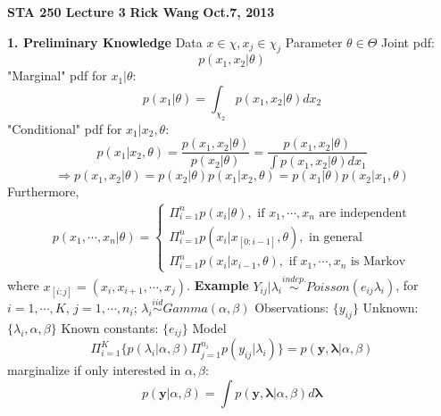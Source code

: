 \documentclass[12pt]{article}
\begin{document}
\begin{center}
	\Large\textbf{STA 250 Lecture 3} \newline
	\small\textbf{Rick Wang} \newline
	\small\textbf{Oct.7, 2013} \newline
\end{center}
\textbf{1. Preliminary Knowledge} \newline \newline
Data $x \in \chi, x_j \in \chi_j$ \newline Parameter $\theta \in \Theta$ \newline
Joint pdf:
\[
	p(x_1, x_2 | \theta)
\]
"Marginal" pdf for $x_1 | \theta$:
\[
	p(x_1 | \theta) = \int_{\chi_2} p(x_1, x_2 | \theta) dx_2
\]
"Conditional" pdf for $x_1 | x_2, \theta$:
\[
	p(x_1 | x_2, \theta) = \frac{p(x_1, x_2 | \theta)}{p(x_2 | \theta)} = \frac{p(x_1, x_2 | \theta)}{\int p(x_1, x_2 | \theta) dx_1}
\]
\[
	\Rightarrow p(x_1, x_2 | \theta) = p(x_2 | \theta) p(x_1 | x_2, \theta) = p(x_1 | \theta) p(x_2 | x_1, \theta)
\]
Furthermore,
\begin{align*}
	p(x_1, \cdots, x_n | \theta) = 
	\begin{cases} 
		\Pi_{i = 1}^n p(x_i | \theta), \text{ if $x_1, \cdots, x_n$ are independent} \\
		\Pi_{i = 1}^n p(x_i | x_{[0:i-1]}, \theta), \text{ in general} \\
		\Pi_{i = 1}^n p(x_i | x_{i-1}, \theta), \text{ if $x_1, \cdots, x_n$ is Markov}
	\end{cases}
\end{align*}
where $x_{[i:j]} = (x_i, x_{i+1}, \cdots, x_j)$. \newline \newline
\textbf{Example} \newline
$Y_{ij} | \lambda_i \stackrel{indep.}{\sim} Poisson(e_{ij} \lambda_i)$, for $i = 1, \cdots, K$, $j = 1, \cdots, n_i$; $\lambda_i \stackrel{iid}{\sim} Gamma(\alpha, \beta)$ \newline
Observations: $\{y_{ij}\}$ \newline
Unknown: $\{\lambda_i, \alpha, \beta\}$ \newline
Known constants: $\{e_{ij}\}$ \newline
Model
\[
	\Pi_{i=1}^K \{p(\lambda_i | \alpha, \beta) \Pi_{j = 1}^{n_i} p(y_{ij} | \lambda_i)\} = p(\mathbf{y}, \boldsymbol{\lambda} | \alpha, \beta)
\]
marginalize if only interested in $\alpha, \beta$:
\[
	p(\mathbf{y} | \alpha, \beta) = \int p(\mathbf{y}, \boldsymbol{\lambda} | \alpha, \beta)d\boldsymbol{\lambda} 
\]
\end{document}
